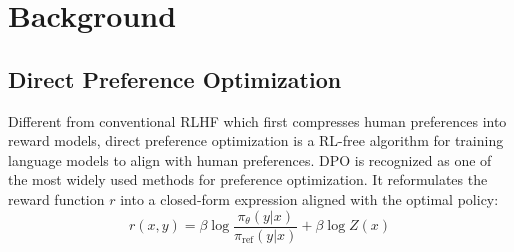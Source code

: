 \section{Background}







\subsection{Direct Preference Optimization}
Different from conventional RLHF which first compresses human preferences into reward models, direct preference optimization is a RL-free algorithm for training language models to align with human preferences.
DPO is recognized as one of the most widely used methods for preference optimization. 
It reformulates the reward function $r$ into a closed-form expression aligned with the optimal policy:
\begin{equation}
r(x, y) = \beta \log \frac{\pi_\theta(y | x)}{\pi_{\text{ref}}(y | x)} + \beta \log Z(x) \nonumber
\end{equation}

